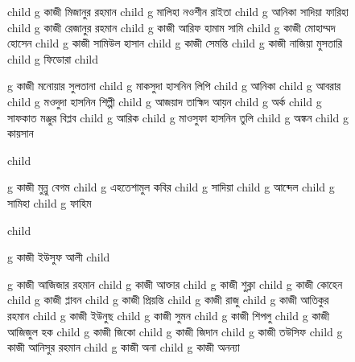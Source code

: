 \documentclass{article}
\begin{document}
\begin{figure}
{\begin{genealogypicture}
{{{{{{              child{    g{ কাজী মিজানুর রহমান }  
                  child{    g{ মালিহা নওশীন রাইতা    }   }
                  child{    g{ আনিকা সাদিয়া ফারিহা }   }
              }
              child{    g{ কাজী রেজানুর রহমান } 
                  child{    g{ কাজী আরিফ হামাম সামি }   }
              }
            }
            child{
              g{ কাজী মোহাম্মদ হোসেন }
              child{    g{ কাজী সামিউল হাসান  } 
                child{ g{ কাজী সেমন্তি }  }
                }
              child{    g{ কাজী নাজিয়া মুসতারি }
              child{ g{ ফিডোরা  }  }
              }
            }
            child{
              g{ কাজী মনোয়ার সুলতানা }
                child{ g{ মাকসুদা হাসনিন লিপি }
                  child{ g{ আনিকা }  }
                  child{ g{ আবরার }  }
                }
                child{ g{ মওদুদা হাসনিন শিল্পী }
                    child{ g{ আজয়াদ তাহ্মিদ আয়ন   }  }
                    child{ g{ অর্ক }  }
                  }
                child{ g{ সাফকাত মঞ্জুর বিপ্লব } 
                child{ g{ আরিক }  }
                }
                child{ g{ মাওসুফা হাসনিন তুলি }
                  child{ g{ অঙ্কন }  }
                  child{ g{ কায়সান }  }
                }

            }%
            child{
              g{ কাজী মুন্নু বেগম}
               child{ g{ এহতেশামুল কবির }
                    child{ g{ সাদিয়া }  }
                    child{ g{ আব্দেল}  }
                    child{ g{ সামিহা }  }
                    child{ g{ ফাহিম }  }
               }

            }

          }       
        }
      }
      child{
        g{ কাজী ইউসুফ আলী }
          child{    g{ কাজী আজিজার রহমান } 
              child{    g{ কাজী আক্তার }
                child{    g{ কাজী শুক্লা }   }
                child{    g{ কাজী কোহেন } 
                    child{    g{ কাজী প্লাবন }   }
                    child{    g{ কাজী প্রিয়ন্তি }   }
                  }
                child{    g{ কাজী রাজু }   }  
              }
              child{    g{ কাজী আতিকুর রহমান }   }
              child{    g{ কাজী ইউনুছ } 
                  child{    g{ কাজী সুমন }   }
                  child{    g{ কাজী শিপলু  }   }
              }
              child{    g{ কাজী আজিজুল হক }
                  child{    g{ কাজী জিকো } child{    g{ কাজী জিদান }   }   }
                  child{    g{ কাজী তউসিফ }   }
              }
              child{    g{ কাজী আনিসুর রহমান } 
                  child{    g{ কাজী অনা  }   }
                  child{    g{ কাজী অনন্যা }   }
              }

}}}}
\end{genealogypicture}}
\end{figure}
\end{document}
